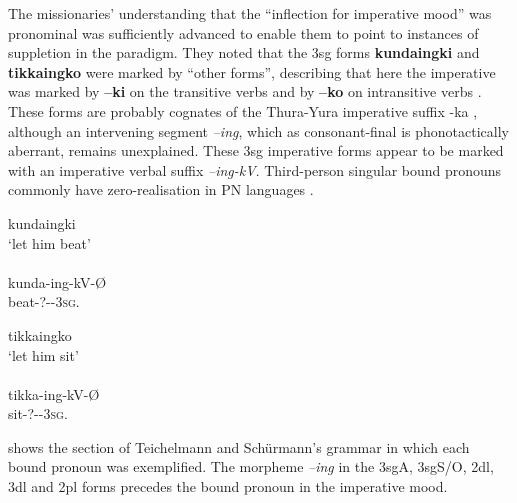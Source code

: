 The missionaries' understanding that the “inflection for imperative mood” was pronominal was sufficiently advanced to enable them to point to instances of suppletion in the paradigm. They noted that the 3sg forms \textbf{kundaingki} and \textbf{tikkaing\-ko} were marked by “other forms”, describing that here the imperative was marked by \textbf{–ki} on the transitive verbs and by \textbf{–ko} on intransitive verbs \citep[17]{teichelmann_outlines_1840}. These forms are probably cognates of the Thura-Yura imperative suffix -ka \citep[279]{hercus_tragedy_2001}, although an intervening segment \textit{–ing}, which as consonant-final is phonotactically aberrant, remains unexplained. These 3sg imperative forms appear to be marked with an imperative verbal suffix \textit{–ing-kV}. Third-person singular bound pronouns commonly have zero-realisation in PN languages \citep[343]{dixon_preface_2002}.

\ea\label{ex:5:19}
kundaingki \\
\glt       `let him beat' \\
\citep[17]{teichelmann_outlines_1840} \\
\gll kunda-ing-kV-Ø \\
beat-?--3\textsc{sg}.\\
\z

\ea\label{ex:5:20}
tikkaingko \\
\glt `let him sit' \\
\citep[17]{teichelmann_outlines_1840} \\
\gll tikka-ing-kV-Ø\\
sit-?--3\textsc{sg}.\\
\z


 shows the section of Teichelmann and Schürmann’s grammar in which each bound pronoun was exemplified. The morpheme \textit{–ing} in the 3sgA, 3sgS/O, 2dl, 3dl and 2pl forms precedes the bound pronoun in the imperative mood.

